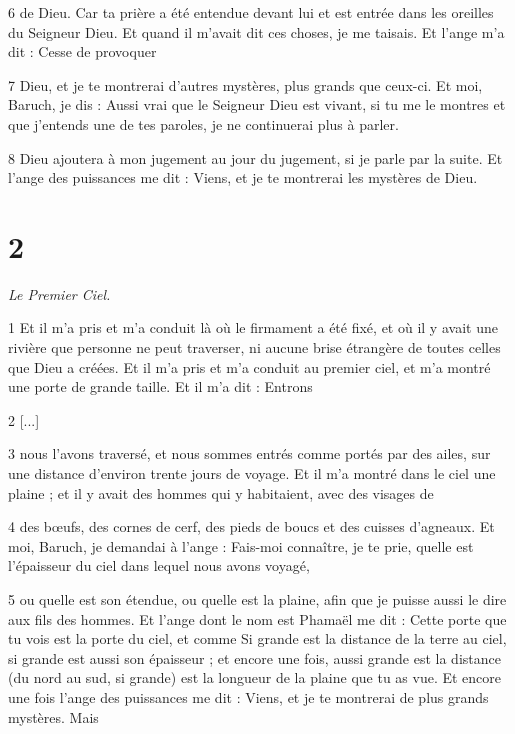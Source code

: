 \par 6 de Dieu. Car ta prière a été entendue devant lui et est entrée dans les oreilles du Seigneur Dieu. Et quand il m'avait dit ces choses, je me taisais. Et l'ange m'a dit : Cesse de provoquer

\par 7 Dieu, et je te montrerai d'autres mystères, plus grands que ceux-ci. Et moi, Baruch, je dis : Aussi vrai que le Seigneur Dieu est vivant, si tu me le montres et que j'entends une de tes paroles, je ne continuerai plus à parler.

\par 8 Dieu ajoutera à mon jugement au jour du jugement, si je parle par la suite. Et l'ange des puissances me dit : Viens, et je te montrerai les mystères de Dieu.

\chapter{2}

\par \textit{Le Premier Ciel.}

\par 1 Et il m'a pris et m'a conduit là où le firmament a été fixé, et où il y avait une rivière que personne ne peut traverser, ni aucune brise étrangère de toutes celles que Dieu a créées. Et il m'a pris et m'a conduit au premier ciel, et m'a montré une porte de grande taille. Et il m'a dit : Entrons

\par 2 [...]

\par 3 nous l'avons traversé, et nous sommes entrés comme portés par des ailes, sur une distance d'environ trente jours de voyage. Et il m'a montré dans le ciel une plaine ; et il y avait des hommes qui y habitaient, avec des visages de

\par 4 des bœufs, des cornes de cerf, des pieds de boucs et des cuisses d'agneaux. Et moi, Baruch, je demandai à l'ange : Fais-moi connaître, je te prie, quelle est l'épaisseur du ciel dans lequel nous avons voyagé,

\par 5 ou quelle est son étendue, ou quelle est la plaine, afin que je puisse aussi le dire aux fils des hommes. Et l'ange dont le nom est Phamaël me dit : Cette porte que tu vois est la porte du ciel, et comme Si grande est la distance de la terre au ciel, si grande est aussi son épaisseur ; et encore une fois, aussi grande est la distance (du nord au sud, si grande) est la longueur de la plaine que tu as vue. Et encore une fois l'ange des puissances me dit : Viens, et je te montrerai de plus grands mystères. Mais

